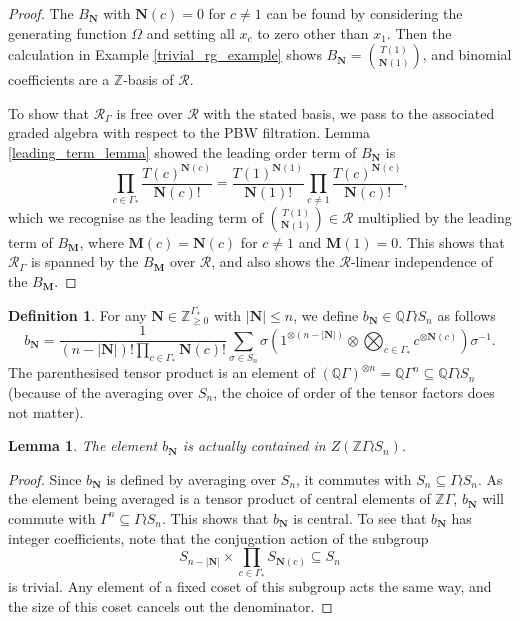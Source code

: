 \documentclass[10pt]{article}
\newtheorem{lemma}[theorem]{Lemma}
\theoremstyle{definition}
\newtheorem{definition}[theorem]{Definition}
\newcommand{\RGamma}{\mathcal{R}_{\Gamma}}
\begin{document}
\begin{proof}
The $B_{\mathbf{N}}$ with $\mathbf{N}(c) = 0$ for $c \neq 1$ can be found by considering the generating function $\Omega$ and setting all $x_c$ to zero other than $x_1$. Then the calculation in Example \ref{trivial_rg_example} shows $B_{\mathbf{N}} = \binom{T(1)}{\mathbf{N}(1)}$, and binomial coefficients are a $\mathbb{Z}$-basis of $\mathcal{R}$.

To show that $\RGamma$ is free over $\mathcal{R}$ with the stated basis, we pass to the associated graded algebra with respect to the PBW filtration. Lemma \ref{leading_term_lemma} showed the leading order term of $B_{\mathbf{N}}$ is 
\[
\prod_{c \in \Gamma_*} \frac{T(c)^{\mathbf{N}(c)}}{\mathbf{N}(c)!} = 
\frac{T(1)^{\mathbf{N}(1)}}{\mathbf{N}(1)!}  \prod_{c \neq 1} \frac{T(c)^{\mathbf{N}(c)}}{\mathbf{N}(c)!},
\]
which we recognise as the leading term of $\binom{T(1)}{\mathbf{N}(1)} \in \mathcal{R}$ multiplied by the leading term of $B_{\mathbf{M}}$, where $\mathbf{M}(c) = \mathbf{N}(c)$ for $c \neq 1$ and $\mathbf{M}(1) = 0$. This shows that $\RGamma$ is spanned by the $B_{\mathbf{M}}$ over $\mathcal{R}$, and also shows the $\mathcal{R}$-linear independence of the $B_{\mathbf{M}}$.
\end{proof}



\begin{definition}
For any $\mathbf{N} \in \mathbb{Z}_{\geq 0}^{\Gamma_*}$ with $|\mathbf{N}| \leq n$, we define $b_{\mathbf{N}} \in \mathbb{Q}\Gamma \wr S_n$ as follows
\[
b_{\mathbf{N}} = \frac{1}{(n - |\mathbf{N}|)! \prod_{c \in \Gamma_*} \mathbf{N}(c)!}
\sum_{\sigma \in S_n} \sigma \left( 1^{\otimes (n - |\mathbf{N}|)} \otimes \bigotimes_{c \in \Gamma_*} c^{\otimes \mathbf{N}(c)} \right) \sigma^{-1}.
\]
The parenthesised tensor product is an element of $(\mathbb{Q} \Gamma)^{\otimes n} = \mathbb{Q}\Gamma^n \subseteq \mathbb{Q}\Gamma \wr S_n$ \textup{(}because of the averaging over $S_n$, the choice of order of the tensor factors does not matter\textup{)}.
\end{definition}
\begin{lemma}
The element $b_{\mathbf{N}}$ is actually contained in $Z(\mathbb{Z}\Gamma \wr S_n)$.
\end{lemma}
\begin{proof}
Since $b_{\mathbf{N}}$ is defined by averaging over $S_n$, it commutes with $S_n \subseteq \Gamma \wr S_n$. As the element being averaged is a tensor product of central elements of $\mathbb{Z}\Gamma$, $b_{\mathbf{N}}$ will commute with $\Gamma^n \subseteq \Gamma \wr S_n$. This shows that $b_{\mathbf{N}}$ is central. To see that $b_{\mathbf{N}}$ has integer coefficients, note that the conjugation action of the subgroup 
\[
S_{n - |\mathbf{N}|} \times \prod_{c \in \Gamma_*} S_{\mathbf{N}(c)} \subseteq S_n
\]
is trivial. Any element of a fixed coset of this subgroup acts the same way, and the size of this coset cancels out the denominator.
\end{proof}
\end{document}
